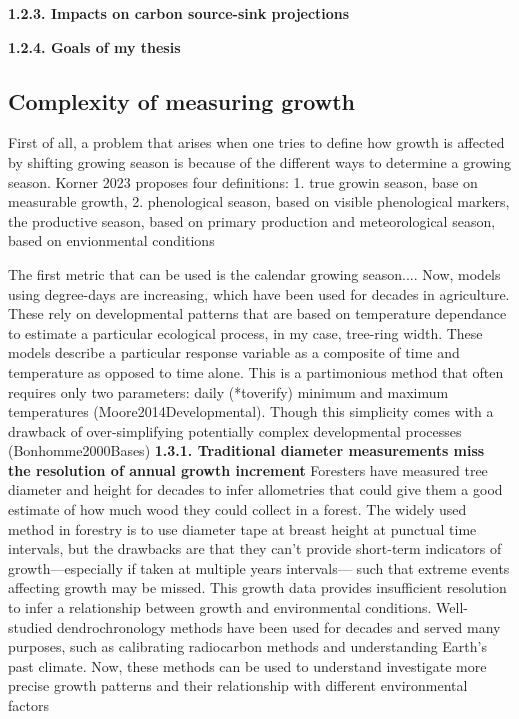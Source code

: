 \documentclass{article}
\begin{document}
\textbf{1.2.3. Impacts on carbon source-sink projections} 

\textbf{1.2.4. Goals of my thesis} 

\subsection{Complexity of measuring growth}
First of all, a problem that arises when one tries to define how growth is affected by shifting growing season is because of the different ways to determine a growing season. Korner 2023 proposes four definitions: 1. true growin season, base on measurable growth, 2. phenological season, based on visible phenological markers, the productive season, based on primary production and meteorological season, based on envionmental conditions %

The first metric that can be used is the calendar growing season.... Now, models using degree-days are increasing, which have been used for decades in agriculture. These rely on developmental patterns that are based on temperature dependance to estimate a particular ecological process, in my case, tree-ring width. These models describe a particular response variable as a composite of time and temperature as opposed to time alone. This is a partimonious method that often requires only two parameters: daily (*toverify) minimum and maximum temperatures (Moore2014Developmental).  Though this simplicity comes with a drawback of over-simplifying potentially complex developmental processes (Bonhomme2000Bases)
\textbf{1.3.1. Traditional diameter measurements miss the resolution of annual growth increment}
Foresters have measured tree diameter and height for decades to infer allometries that could give them a good estimate of how much wood they could collect in a forest. The widely used method in forestry is to use diameter tape at breast height at punctual time intervals, but the drawbacks are that they can't provide short-term indicators of growth---especially if taken at multiple years intervals--- such that extreme events affecting growth may be missed. This growth data provides insufficient resolution to infer a relationship between growth and environmental conditions. Well-studied dendrochronology methods have been used for decades and served many purposes, such as calibrating radiocarbon methods and understanding Earth's past climate. Now, these methods can be used to understand investigate more precise growth patterns and their relationship with different environmental factors
\end{document}
